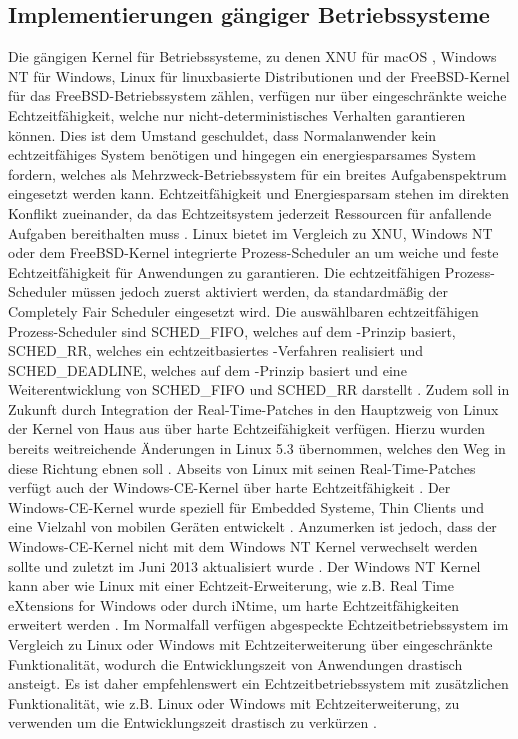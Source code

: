 \subsection{Implementierungen gängiger Betriebssysteme} %
Die gängigen Kernel für Betriebssysteme, zu denen XNU für macOS \cite{noauthor_xnu_2019}, Windows NT für Windows, Linux für linuxbasierte Distributionen und der FreeBSD-Kernel für das FreeBSD-Betriebssystem zählen, verfügen nur über eingeschränkte weiche Echtzeitfähigkeit, welche nur nicht-deterministisches Verhalten garantieren können. Dies ist dem Umstand geschuldet, dass Normalanwender kein echtzeitfähiges System benötigen und hingegen ein energiesparsames System fordern, welches als Mehrzweck-Betriebssystem für ein breites Aufgabenspektrum eingesetzt werden kann. Echtzeitfähigkeit und Energiesparsam stehen im direkten Konflikt zueinander, da das Echtzeitsystem jederzeit Ressourcen für anfallende Aufgaben bereithalten muss \cite{noauthor_what_is_an_rtos_nodate}. Linux bietet im Vergleich zu XNU, Windows NT oder dem FreeBSD-Kernel integrierte Prozess-Scheduler an um weiche und feste Echtzeitfähigkeit für Anwendungen zu garantieren. Die echtzeitfähigen Prozess-Scheduler müssen jedoch zuerst aktiviert werden, da standardmäßig der Completely Fair Scheduler eingesetzt wird. Die auswählbaren echtzeitfähigen Prozess-Scheduler sind SCHED\_FIFO, welches auf dem -Prinzip basiert, SCHED\_RR, welches ein echtzeitbasiertes -Verfahren realisiert und SCHED\_DEADLINE, welches auf dem -Prinzip basiert und eine Weiterentwicklung von SCHED\_FIFO und SCHED\_RR darstellt \cite{noauthor_sched_deadline_2020}. Zudem soll in Zukunft durch Integration der Real-Time-Patches in den Hauptzweig von Linux der Kernel von Haus aus über harte Echtzeifähigkeit verfügen. Hierzu wurden bereits weitreichende Änderungen in Linux 5.3 übernommen, welches den Weg in diese Richtung ebnen soll \cite{leemhuis_linux_nodate}. Abseits von Linux mit seinen Real-Time-Patches verfügt auch der Windows-CE-Kernel über harte Echtzeitfähigkeit \cite{chattopadhyay_embedded_2013}. Der Windows-CE-Kernel wurde speziell für Embedded Systeme, Thin Clients und eine Vielzahl von mobilen Geräten entwickelt \cite{hall_windows_ce_2005}. Anzumerken ist jedoch, dass der Windows-CE-Kernel nicht mit dem Windows NT Kernel verwechselt werden sollte und zuletzt im Juni 2013 aktualisiert wurde \cite{noauthor_microsoft_windows_ce_2019}. Der Windows NT Kernel kann aber wie Linux mit einer Echtzeit-Erweiterung, wie z.B. Real Time eXtensions for Windows oder durch iNtime, um harte Echtzeitfähigkeiten erweitert werden \cite{marchesin_using_2004}. Im Normalfall verfügen abgespeckte Echtzeitbetriebssystem im Vergleich zu Linux oder Windows mit Echtzeiterweiterung über eingeschränkte Funktionalität, wodurch die Entwicklungszeit von Anwendungen drastisch ansteigt. Es ist daher empfehlenswert ein Echtzeitbetriebssystem mit zusätzlichen Funktionalität, wie z.B. Linux oder Windows mit Echtzeiterweiterung, zu verwenden um die Entwicklungszeit drastisch zu verkürzen \cite[433]{noauthor_echtzeitsystem_2020}.



